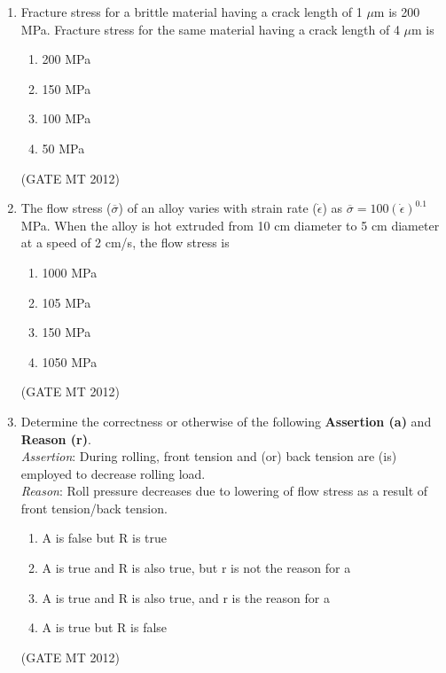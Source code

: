 \documentclass[journal, 11pt, onecolumn]{IEEEtran}
\theoremstyle{remark}
\begin{document}
\begin{enumerate}
\begin{enumerate}
\begin{multicols}{2}
\begin{enumerate}  
\item P-2, Q-3, R-4, S-1
\item P-2, Q-4, R-3, S-1
\item P-1, Q-2, R-4, S-3
\item P-1, Q-2, R-4, S-3
\end{enumerate}
\end{multicols}
\hfill(GATE MT 2012)

\item Fracture stress for a brittle material having a crack length of 1 $\mu$m is 200 MPa. Fracture stress for the same material having a crack length of 4 $\mu$m is
\begin{multicols}{2}
\begin{enumerate}  
\item 200 MPa
\item 150 MPa
\item 100 MPa
\item 50 MPa
\end{enumerate}
\end{multicols}
\hfill(GATE MT 2012)

\item The flow stress ($\overline{\sigma}$) of an alloy varies with strain rate ($\dot{\epsilon}$) as $\overline{\sigma} = 100(\dot{\epsilon})^{0.1}$ MPa. When the alloy is hot extruded from 10 cm diameter to 5 cm diameter at a speed of 2 cm/s, the flow stress is
\begin{multicols}{2}
\begin{enumerate}  
\item 1000 MPa
\item 105 MPa
\item 150 MPa
\item 1050 MPa
\end{enumerate}
\end{multicols}
\hfill(GATE MT 2012)

\item Determine the correctness or otherwise of the following \textbf{Assertion (a)} and \textbf{Reason (r)}.
\\[0.5em]\textit{Assertion}: During rolling, front tension and (or) back tension are (is) employed to decrease rolling load.\\
\textit{Reason}: Roll pressure decreases due to lowering of flow stress as a result of front tension/back tension.
\begin{enumerate}  
\item A is false but R is true
\item A is true and R is also true, but r is not the reason for a
\item A is true and R is also true, and r is the reason for a
\item A is true but R is false
\end{enumerate}
\hfill(GATE MT 2012)



\end{enumerate}
\end{enumerate}
\end{document}
